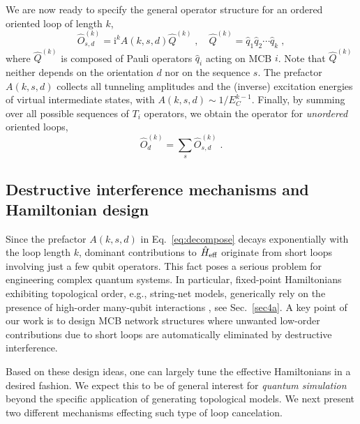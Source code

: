 \documentclass[twocolumn,floats,prx,showpacs]{revtex4-1}
\begin{document}
We are now ready to specify the general operator structure for an ordered oriented loop of length $k$, 
\begin{equation}\label{eq:decompose}
\hat O^{(k)}_{s,d}= \mathrm i^k  A(k,s,d) \hat Q^{(k)} \;,
\quad \hat Q^{(k)}=\hat q_1 \hat q_2 \cdots \hat q_k\;,
\end{equation}
where $\hat Q^{(k)}$ is composed of Pauli operators $\hat q_i$ acting on MCB $i$. Note that $\hat Q^{(k)}$ 
neither depends on the orientation $d$ nor on the sequence $s$. The 
prefactor $A(k,s,d)$ collects all tunneling amplitudes and the (inverse) excitation energies of virtual intermediate states, with $A(k,s,d)\sim  1/E_C^{k-1}$.  Finally, by summing over all possible sequences of $T_i$ operators, we obtain the operator for \emph{unordered} oriented loops,
\begin{equation}
\hat O^{(k)}_d = \sum_{s} \hat O^{(k)}_{s,d} \;. \label{eq:unordered}
\end{equation}




\subsection{Destructive interference mechanisms and Hamiltonian design} \label{sec2e}

Since the prefactor $A(k,s,d)$ in Eq.~\eqref{eq:decompose} decays exponentially with the loop length $k$, dominant contributions to $\hat H_{\rm eff}$ 
originate from short loops involving just a few qubit operators.
This fact poses a serious problem for engineering complex quantum systems. In particular, fixed-point Hamiltonians exhibiting topological order, e.g., string-net models, generically rely on the presence of high-order many-qubit interactions \cite{Levin2005,Fidkowski2009,Wen2017}, see Sec.~\ref{sec4a}. A key point of our work is to design MCB network structures where unwanted low-order contributions due to short loops are automatically eliminated by destructive interference.  

Based on these design ideas, one can largely tune the effective Hamiltonians in a desired fashion. We expect this to be of general interest for \emph{quantum simulation} beyond the specific application of generating topological models.
We next present two different mechanisms effecting such type of loop cancelation.
\end{document}
